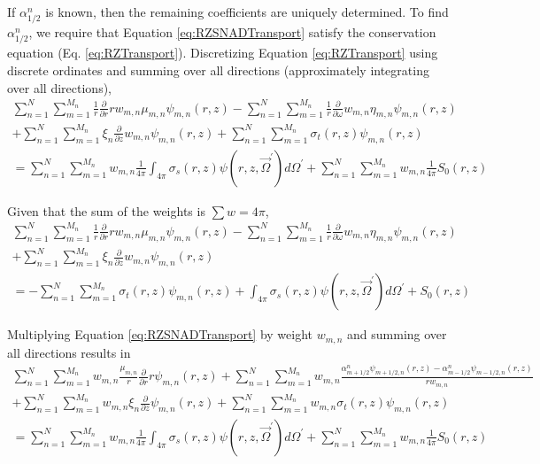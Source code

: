 \documentclass[12pt]{article}
\begin{document}
\noindent If $\alpha_{1/2}^n$ is known, then the remaining coefficients are uniquely determined. To find $\alpha_{1/2}^n$, we require that Equation \ref{eq:RZSNADTransport} satisfy the conservation equation (Eq. \ref{eq:RZTransport}).
%
\iffalse
Discretizing Equation \ref{eq:RZTransport} using discrete ordinates and summing over all directions (approximately integrating over all directions),
\begin{multline}
\sum_{n=1}^N \sum_{m=1}^{M_n} \frac{1}{r} \frac{\partial}{\partial r} r w_{m,n} \mu_{m,n} \psi_{m,n} \left(r,z \right) - \sum_{n=1}^N \sum_{m=1}^{M_n} \frac{1}{r} \frac{\partial}{\partial \omega} w_{m,n} \eta_{m,n} \psi_{m,n} \left(r,z \right) \\
+ \sum_{n=1}^N \sum_{m=1}^{M_n} \xi_n \frac{\partial}{\partial z} w_{m,n} \psi_{m,n} \left(r,z \right) + \sum_{n=1}^N \sum_{m=1}^{M_n} \sigma_t \left(r,z \right) \psi_{m,n} \left(r,z \right) \\
= \sum_{n=1}^N \sum_{m=1}^{M_n} w_{m,n} \frac{1}{4 \pi} \int_{4 \pi} \sigma_s \left(r,z \right) \psi \left(r,z, \vec{\Omega}^\prime \right) d \Omega^\prime + \sum_{n=1}^N \sum_{m=1}^{M_n} w_{m,n} \frac{1}{4 \pi} S_0 \left(r,z \right)
\end{multline}

\noindent Given that the sum of the weights is $\sum w = 4 \pi$,
\begin{multline}
\sum_{n=1}^N \sum_{m=1}^{M_n} \frac{1}{r} \frac{\partial}{\partial r} r w_{m,n} \mu_{m,n} \psi_{m,n} \left(r,z \right) - \sum_{n=1}^N \sum_{m=1}^{M_n} \frac{1}{r} \frac{\partial}{\partial \omega} w_{m,n} \eta_{m,n} \psi_{m,n} \left(r,z \right) \\
+ \sum_{n=1}^N \sum_{m=1}^{M_n} \xi_n \frac{\partial}{\partial z} w_{m,n} \psi_{m,n} \left(r,z \right) \\
= - \sum_{n=1}^N \sum_{m=1}^{M_n} \sigma_t \left(r,z \right) \psi_{m,n} \left(r,z \right) + \int_{4 \pi} \sigma_s \left(r,z \right) \psi \left(r,z, \vec{\Omega}^\prime \right) d \Omega^\prime +  S_0 \left(r,z \right)
\end{multline}

\noindent Multiplying Equation \ref{eq:RZSNADTransport} by weight $w_{m,n}$ and summing over all directions results in
\begin{multline}
\sum_{n=1}^N \sum_{m=1}^{M_n} w_{m,n} \frac{\mu_{m,n}}{r} \frac{\partial}{\partial r} r \psi_{m,n} \left(r,z \right) + \sum_{n=1}^N \sum_{m=1}^{M_n} w_{m,n} \frac{\alpha_{m+1/2}^n \psi_{m+1/2,n} (r,z) - \alpha_{m-1/2}^n \psi_{m-1/2,n} (r,z)}{r w_{m,n}} \\
+ \sum_{n=1}^N \sum_{m=1}^{M_n} w_{m,n} \xi_n \frac{\partial}{\partial z} \psi_{m,n} \left(r,z \right) + \sum_{n=1}^N \sum_{m=1}^{M_n} w_{m,n} \sigma_t \left(r,z \right) \psi_{m,n} \left(r,z \right) \\
= \sum_{n=1}^N \sum_{m=1}^{M_n} w_{m,n} \frac{1}{4 \pi} \int_{4 \pi} \sigma_s \left(r,z \right) \psi \left(r,z, \vec{\Omega}^\prime \right) d \Omega^\prime + \sum_{n=1}^N \sum_{m=1}^{M_n} w_{m,n} \frac{1}{4 \pi} S_0 \left(r,z \right)
\end{multline}
\end{document}
